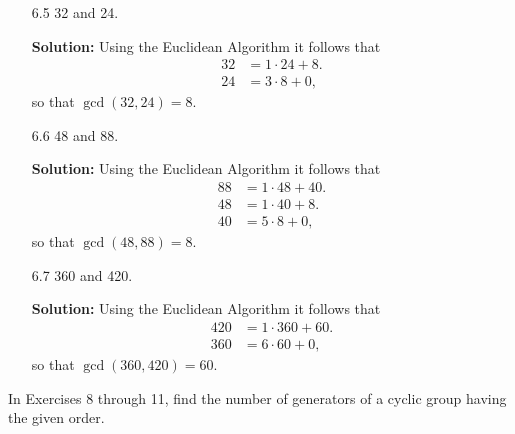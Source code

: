 \begin{enumerate}
   \item[6.5]  32 and 24.
   
      \textbf{Solution:} Using the Euclidean Algorithm it follows that
      \begin{align*}
         32 &= 1 \cdot 24 + 8. \\
         24 &= 3 \cdot 8 + 0,
      \end{align*}
      so that $\gcd(32, 24) = 8$.
   \item[6.6]  48 and 88.
   
      \textbf{Solution:} Using the Euclidean Algorithm it follows that
      \begin{align*}
         88 &= 1 \cdot 48 + 40.  \\
         48 &= 1 \cdot 40 + 8.   \\
         40 &= 5 \cdot 8 + 0,
      \end{align*}
      so that $\gcd(48, 88) = 8$.
   \item[6.7]  360 and 420.
   
      \textbf{Solution:} Using the Euclidean Algorithm it follows that
      \begin{align*}
         420 &= 1 \cdot 360 + 60.  \\
         360 &= 6 \cdot 60 + 0,
      \end{align*}
      so that $\gcd(360, 420) = 60$.
\end{enumerate}

\noindent      In Exercises 8 through 11, find the number of generators of a
               cyclic group having the given order.

